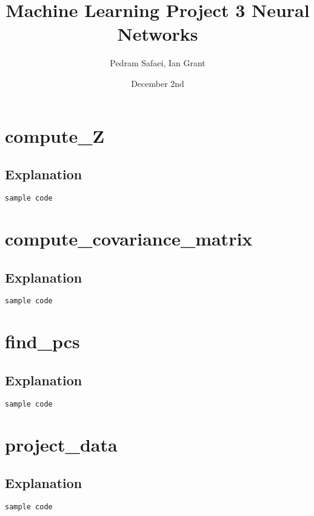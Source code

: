 \documentclass{article}
\title{Machine Learning Project 3 Neural Networks}
\author{Pedram Safaei, Ian Grant }
\date{December 2nd}
\begin{document}
\maketitle

\section{compute\_Z}
\subsection{Explanation}

\begin{lstlisting}[language=Python]
sample code 
\end{lstlisting}


\section{compute\_covariance\_matrix}
\subsection{Explanation}

\begin{lstlisting}[language=Python]
sample code 
\end{lstlisting}

\section{find\_pcs}
\subsection{Explanation}

\begin{lstlisting}[language=Python]
sample code 
\end{lstlisting}

\section{project\_data}
\subsection{Explanation}

\begin{lstlisting}[language=Python]
sample code 
\end{lstlisting}
\end{document}
